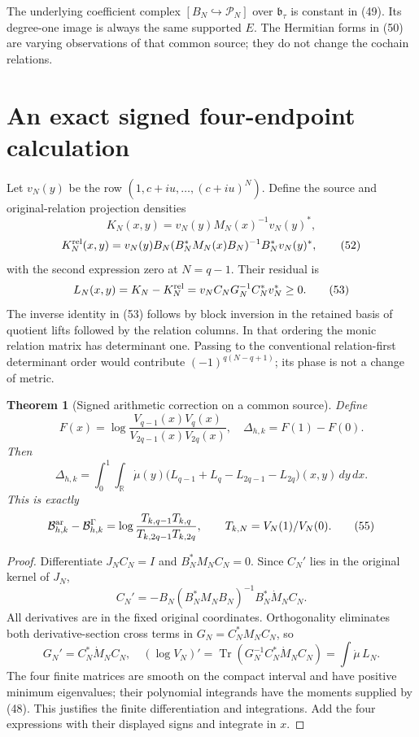 \documentclass[11pt,a4paper]{article}
\newtheorem{theorem}{Theorem}[section]
\begin{document}
The underlying coefficient complex $[B_N\hookrightarrow\mathcal P_N]$ over $\mathfrak b_\tau$ is constant in (49). Its degree-one image is always the same supported $E$. The Hermitian forms in (50) are varying observations of that common source; they do not change the cochain relations.

\section{An exact signed four-endpoint calculation}
Let $v_N(y)$ be the row $(1,c+iu,\ldots,(c+iu)^N)$. Define the source and original-relation projection densities
\[
 K_N(x,y)=v_N(y)M_N(x)^{-1}v_N(y)^*,
\]
\[
 K_N^{\rm rel}(x,y)
 =v_N(y)B_N(B_N^*M_N(x)B_N)^{-1}B_N^*v_N(y)^*,
 \tag{52}
\]
with the second expression zero at $N=q-1$. Their residual is
\[
 L_N(x,y)=K_N-K_N^{\rm rel}
  =v_NC_NG_N^{-1}C_N^*v_N^*\ge0.
 \tag{53}
\]
The inverse identity in (53) follows by block inversion in the retained basis of quotient lifts followed by the relation columns. In that ordering the monic relation matrix has determinant one. Passing to the conventional relation-first determinant order would contribute $(-1)^{q(N-q+1)}$; its phase is not a change of metric.

\begin{theorem}[Signed arithmetic correction on a common source]
Define
\[
 F(x)=\log\frac{V_{q-1}(x)V_q(x)}{V_{2q-1}(x)V_{2q}(x)},
 \quad \Delta_{h,k}=F(1)-F(0).
\]
Then
\[
 \boxed{\Delta_{h,k}
   =\int_0^1\!\int_{\mathbb R}\dot\mu(y)
       \bigl(L_{q-1}+L_q-L_{2q-1}-L_{2q}\bigr)(x,y)\,dy\,dx.}
 \tag{54}
\]
This is exactly
\[
 \mathcal B^{\rm ar}_{h,k}-\mathcal B^\Gamma_{h,k}
 =\log\frac{T_{k,q-1}T_{k,q}}{T_{k,2q-1}T_{k,2q}},
 \qquad T_{k,N}=V_N(1)/V_N(0).
 \tag{55}
\]
\end{theorem}
\begin{proof}
Differentiate $J_NC_N=I$ and $B_N^*M_NC_N=0$. Since $C_N'$ lies in the original kernel of $J_N$,
\[
 C_N'=-B_N(B_N^*M_NB_N)^{-1}B_N^*\dot M_NC_N.
 \tag{56}
\]
All derivatives are in the fixed original coordinates. Orthogonality eliminates both derivative-section cross terms in $G_N=C_N^*M_NC_N$, so
\[
 G_N'=C_N^*\dot M_NC_N,
 \quad(\log V_N)'=\operatorname{Tr}(G_N^{-1}C_N^*\dot M_NC_N)
                 =\int\dot\mu\,L_N.
 \tag{57}
\]
The four finite matrices are smooth on the compact interval and have positive minimum eigenvalues; their polynomial integrands have the moments supplied by (48). This justifies the finite differentiation and integrations. Add the four expressions with their displayed signs and integrate in $x$.
\end{proof}
\end{document}
